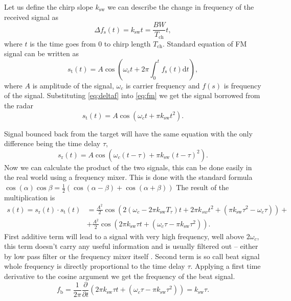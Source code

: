Let us define the chirp slope $k_\mathrm{sw}$ we can describe the change in frequency of the received signal as
\begin{equation}
	\Delta f_\mathrm{s}(t) = k_\mathrm{sw}t = \frac{BW}{T_\mathrm{ch}} t,
	\label{eq:deltaf}
\end{equation}
where $t$ is the time goes from 0 to chirp length $T_\mathrm{ch}$. Standard equation of FM signal can be written as
\begin{equation}
	s_\mathrm{t}(t) = A \cos\left(\omega_c t + 2\pi \int_{0}^{t} f_\mathrm{s}(t) \mathrm{d}t\right),
	\label{eq:fm}
\end{equation}
where $A$ is amplitude of the signal, $\omega_c$ is carrier frequency and $f(s)$ is frequency of the signal. Substituting \ref{eq:deltaf} into \ref{eq:fm} we get the signal borrowed from the radar
\begin{equation}
	s_\mathrm{t}(t) = A \cos(\omega_c t + \pi k_\mathrm{sw}t^2).
	\label{eq:fm2}
\end{equation}

Signal bounced back from the target will have the same equation with the only difference being the time delay $\tau$,
\begin{equation}
	s_\mathrm{r}(t) = A \cos(\omega_c (t - \tau) + \pi k_\mathrm{sw}(t - \tau)^2).
	\label{eq:fm3}
\end{equation}
Now we can calculate the product of the two signals, this can be done easily in the real world using a frequency mixer. This is done with the standard formula $\cos(\alpha)\cos\beta = \frac{1}{2}(\cos(\alpha-\beta)+\cos(\alpha+\beta))$
The result of the multiplication is
\begin{align}
	s(t) = s_\mathrm{r}(t) \cdot  s_\mathrm{t}(t) &= \frac{A^2}{2}\cos\left(2(\omega_c - 2\pi k_\mathrm{sw}T_\tau)t + 2\pi k_{sw}t^2 + (\pi k_\mathrm{sw} \tau^2 - \omega_c \tau) \right)+ \nonumber \\
	&+\frac{A^2}{2} \cos\left(2\pi k_\mathrm{sw} \tau t + (\omega_c \tau - \pi k_\mathrm{sw} \tau^2)\right).
	\label{eq:fm4}
\end{align}
First additive term will lead to a signal with very high frequency, well above $2\omega_c$, this term doesn't carry any useful information and is usually filtered out -- either by low pass filter or the frequency mixer itself \cite{graham2015}.
Second term is so call beat signal whole frequency is directly proportional to the time delay $\tau$.
Applying a first time derivative to the cosine argument we get the frequency of the beat signal.
\begin{equation}
	f_\mathrm{b} = \frac{1}{2\pi}\frac{\partial}{\partial t} \left(2\pi k_\mathrm{sw} \tau t + (\omega_c \tau - \pi k_\mathrm{sw} \tau^2)\right) = k_\mathrm{sw} \tau.
	\label{eq:fb}
\end{equation}

